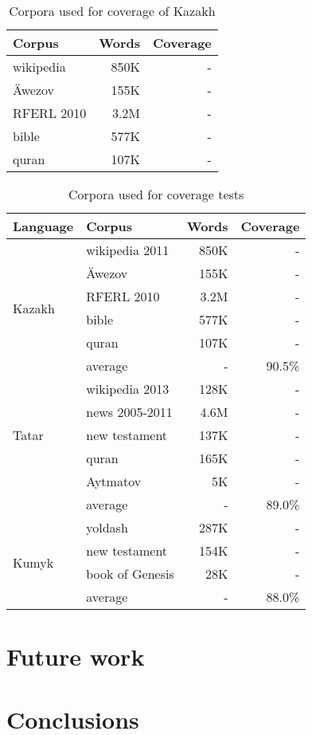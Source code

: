 \documentclass{article}
\begin{document}
\begin{table}
\begin{center}
\begin{tabular}{lrr}
\textbf{Corpus} & \textbf{Words} & \textbf{Coverage} \\
\hline
wikipedia & 850K &  - \\
Äwezov & 155K & - \\
RFERL 2010 & 3.2M & - \\
bible & 577K & - \\
quran & 107K & - \\
\hline
\end{tabular}
 \caption{Corpora used for coverage of Kazakh}
 \label{table:corpora-kaz}
\end{center}
\end{table}

\begin{table}
\begin{center}
\begin{tabular}{llrr}
\toprule
\textbf{Language} & \textbf{Corpus} & \textbf{Words} & \textbf{Coverage} \\
\midrule
\multirow{6}{*}{Kazakh} & wikipedia 2011& 850K &  - \\
	& Äwezov & 155K & - \\
	& RFERL 2010 & 3.2M & - \\
	& bible & 577K & - \\
	& quran & 107K & - \\\cline{2-4}
	& average & - & 90.5\% \\
\midrule
\multirow{5}{*}{Tatar} & wikipedia 2013 & 128K &  - \\
	& news 2005-2011 & 4.6M & - \\
	& new testament & 137K & - \\
	& quran & 165K & - \\
	& Aytmatov & 5K & - \\\cline{2-4}
	& average & - & 89.0\% \\
\midrule
\multirow{4}{*}{Kumyk} & yoldash & 287K &  - \\
	& new testament & 154K & - \\
	& book of Genesis & 28K & - \\\cline{2-4}
	& average & - & 88.0\% \\
\bottomrule
\end{tabular}
 \caption{Corpora used for coverage tests}
 \label{table:corpora}
\end{center}
\end{table}



\section{Future work}


\section{Conclusions}





\end{document}
